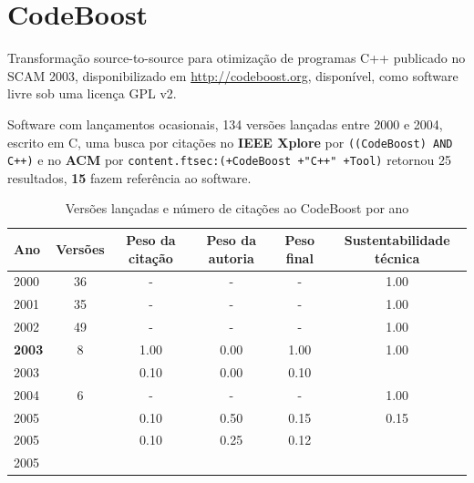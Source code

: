 \section{CodeBoost}

Transformação source-to-source para otimização de programas C++
publicado no SCAM 2003,
disponibilizado em \url{http://codeboost.org},
disponível,
como software livre
sob uma licença GPL v2.

Software com lançamentos ocasionais,
134 versões lançadas
entre 2000 e 2004,
escrito em C,
uma busca por citações no {\bf IEEE Xplore} por
\texttt{((CodeBoost) AND C++)}
e no {\bf ACM} por
\texttt{content.ftsec:(+CodeBoost +"C++" +Tool)}
retornou
25 resultados,
{\bf 15} fazem referência ao software.


\begin{table}[H]
\caption{Versões lançadas e número de citações ao CodeBoost por ano}
\centering
\begin{tabular}{| l | c | c | c | c | c |}
  \hline
  Ano & Versões & Peso da citação & Peso da autoria & Peso final & Sustentabilidade técnica \\
  \hline
        2000 & 36 & - & - & -
        &
          {\color{blue} 1.00}
        \\
\hline
        2001 & 35 & - & - & -
        &
          {\color{blue} 1.00}
        \\
\hline
        2002 & 49 & - & - & -
        &
          {\color{blue} 1.00}
        \\
\hline
            {\bf 2003}
          &
          8
          &
          1.00
          &
          0.00
          &
          1.00
          &
            {\color{blue} 1.00}
          \\
            2003
          &
          
          &
          0.10
          &
          0.00
          &
          0.10
          &
          \\
\hline
        2004 & 6 & - & - & -
        &
          {\color{blue} 1.00}
        \\
\hline
            2005
          &
          
          &
          0.10
          &
          0.50
          &
          0.15
          &
            {\color{red} 0.15}
          \\
            2005
          &
          
          &
          0.10
          &
          0.25
          &
          0.12
          &
          \\
            2005
          &
          

\end{tabular}
\end{table}

